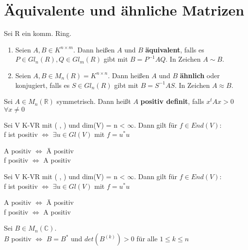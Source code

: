 \section{Äquivalente und ähnliche Matrizen}
\begin{definition}
Sei R ein komm. Ring.
\begin{enumerate}
	\item Seien $A,B \in K^{n \times m}$. Dann heißen $A$ und $B$ \textbf{äquivalent}, falls es $P \in Gl_n(R), Q \in Gl_m(R)$ gibt mit $B=P^{-1}AQ$. In Zeichen $A \sim B$.
	\item Seien $A,B \in M_n(R) = K^{n \times n}$. Dann heißen $A$ und $B$ \textbf{ähnlich} oder konjugiert, falls es $S \in Gl_n(R)$ gibt mit $B=S^{-1}AS$. In Zeichen $A \approx B$.
\end{enumerate}
\end{definition}

\begin{definition}
Sei $A \in M_n(\mathbb{R})$ symmetrisch. Dann heißt $A$ \textbf{positiv definit}, falls $x^tAx > 0$ $\forall x \neq 0$
\end{definition}
\begin{theorem}
\leavevmode
\begin{compactitem}
\item Sei V K-VR mit ( , ) und dim(V) = n < $\infty$. Dann gilt für $f \in End(V)$:\\
f ist positiv $\Leftrightarrow$ $\exists u \in Gl(V)$ mit $f = u^*u$
\item A positiv $\Leftrightarrow$ \={A} positiv\\
f positiv $\Leftrightarrow$ A positiv

\begin{theorem}
\leavevmode
\begin{compactitem}
\item Sei V K-VR mit ( , ) und dim(V) = n < $\infty$. Dann gilt für $f \in End(V)$:\\
f ist positiv $\Leftrightarrow$ $\exists u \in Gl(V)$ mit $f = u^*u$
\item A positiv $\Leftrightarrow$ \={A} positiv\\
f positiv $\Leftrightarrow$ A positiv
\item Sei $B \in M_n(\mathbb{C})$.\\
$B$ positiv $\Leftrightarrow$ $B = B^*$ und $det(B^{(k)}) > 0$ für alle $1 \le k \le n$
\end{compactitem}
\end{theorem}

\end{compactitem}
\end{theorem}


